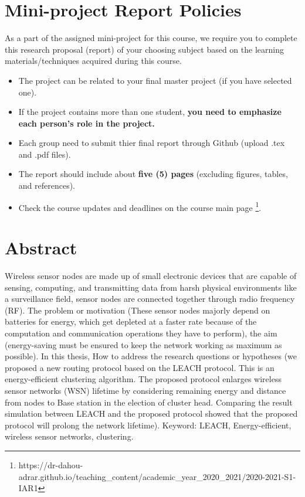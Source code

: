 \documentclass[paper=a4, fontsize=11pt]{scrartcl}
\numberwithin{equation}{section}		%
\numberwithin{figure}{section}			%
\numberwithin{table}{section}				%
\begin{document}
\section{Mini-project Report Policies}

As a part of the assigned mini-project for this course, we require you to complete this research proposal (report) of your choosing subject based on the learning materials/techniques acquired during this course.  
\begin{itemize}
    \item The project can be related to your final master project (if you have selected one).
    \item If the project contains more than one student, \textbf{you need to emphasize each person's role in the project.} 
    \item Each group need to submit thier final report through Github (upload .tex and .pdf files).
    \item The report should include about \textbf{five (5) pages }(excluding figures, tables, and references).
    \item Check the course updates and deadlines on the course main page \footnote{https://dr-dahou-adrar.github.io/teaching\_content/academic\_year\_2020\_2021/2020-2021-S1-IAR1}.
\end{itemize}



\section{Abstract}

Wireless sensor nodes are made up of small electronic devices that are capable of sensing, computing,  and transmitting data from harsh physical environments like a surveillance field, sensor nodes are connected together through radio frequency (RF). The problem or motivation (These sensor nodes majorly depend on batteries for energy, which get depleted at a faster rate because of the computation and communication operations they have to perform), 
the aim (energy-saving must be ensured to keep the network working as maximum as possible). In this thesis, How to address the research questions or hypotheses (we proposed a new routing protocol based on the LEACH protocol. This is an energy-efficient clustering algorithm. The proposed protocol enlarges wireless sensor networks (WSN) lifetime by considering remaining energy and distance from nodes to Base station in the election of cluster head. Comparing the result simulation between LEACH and the proposed protocol showed that the proposed protocol will prolong the network lifetime). \linebreak 
Keyword: 
LEACH, Energy-efficient, wireless sensor networks, clustering.
\end{document}
